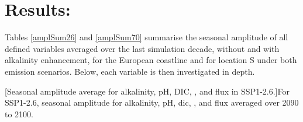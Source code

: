 \chapter{Results:}

Tables \ref{amplSum26} and \ref{amplSum70} summarise the seasonal amplitude of all defined variables averaged over the last simulation decade, without and with alkalinity enhancement, for the European coastline and for location S under both emission scenarios. Below, each variable is then investigated in depth. 

\begin{center}

\begin{table}[H]
[Seasonal amplitude average for alkalinity, pH, \texorpdfstring{DIC}{DIC}, , and  flux in SSP1-2.6.]{For SSP1-2.6, seasonal amplitude for alkalinity, pH, \ac{dic}, , and  flux averaged over 2090 to 2100.
\label{amplSum26}}

\end{table}

\end{center}


